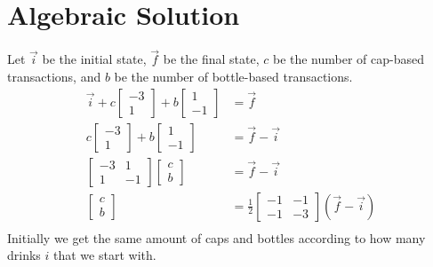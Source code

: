 \documentclass[letterpaper, 12pt]{article}
\begin{document}
\section{Algebraic Solution}
Let $\vec{i}$ be the initial state, $\vec{f}$ be the final state, $c$ be the number of cap-based transactions, and $b$ be the number of bottle-based transactions.
\begin{align*}
    \vec{i}
    + c
    \begin{bmatrix}
        -3\\
        1
    \end{bmatrix}
    + b
    \begin{bmatrix}
        1\\
        -1
    \end{bmatrix}
    &=
    \vec{f}\\
    c
    \begin{bmatrix}
        -3\\
        1
    \end{bmatrix}
    + b
    \begin{bmatrix}
        1\\
        -1
    \end{bmatrix}
    &=
    \vec{f} - \vec{i}\\
    \begin{bmatrix}
        -3 & 1\\
         1 &-1
    \end{bmatrix}
    \begin{bmatrix}
        c\\
        b
    \end{bmatrix}
    &=
    \vec{f} - \vec{i}\\
    \begin{bmatrix}
        c\\
        b
    \end{bmatrix}
    &=
    \frac{1}{2}
    \begin{bmatrix}
        -1 &-1\\
        -1 &-3
    \end{bmatrix}
    (\vec{f} - \vec{i})\\
\end{align*}
Initially we get the same amount of caps and bottles according to how many drinks $i$ that we start with.
\end{document}
